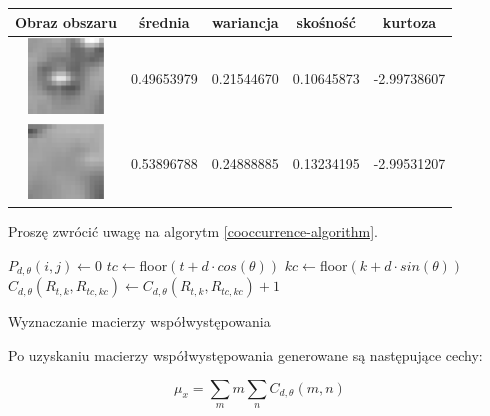 \begin{center}
\begin{table}[htb]
\begin{tabular}{|c|c|c|c|c|}
Obraz obszaru & średnia & wariancja & skośność & kurtoza \\ \hline
\includegraphics[width=2cm]{./../img/texture-feats-examples/bkg/lspot-0420-0162.eps}
	& 0.49653979 & 0.21544670 & 0.10645873 & -2.99738607 \\ \hline
\includegraphics[width=2cm]{./../img/texture-feats-examples/bkg/lspot-0426-0189.eps}
	& 0.53896788 & 0.24888885 & 0.13234195 & -2.99531207 \\ \hline
\end{tabular}
\end{table}
\end{center}

Proszę zwrócić uwagę na algorytm \ref{cooccurrence-algorithm}.

\begin{algorithm}
	\BlankLine
	{
		{
			{
				{
					$P_{d,\theta}(i, j) \leftarrow 0$\;
				}
			}
			{
				{
					$tc \leftarrow $floor$(t + d\cdot cos(\theta))$\;
					$kc \leftarrow $floor$(k + d\cdot sin(\theta))$\;
					{
						$C_{d,\theta}(R_{t,k},R_{tc,kc}) \leftarrow C_{d, \theta}(R_{t,k},R_{tc, kc}) + 1$\;
					}
				}
			}
		}
	}
\caption{Wyznaczanie macierzy współwystępowania}
\label{cooccurrence-algorithm}
\end{algorithm}

Po uzyskaniu macierzy współwystępowania generowane są następujące cechy:

\begin{equation}
\mu_{x} = \displaystyle\sum\limits_{m} m \displaystyle\sum\limits_{n} C_{d,\theta}(m,n)
\end{equation}

